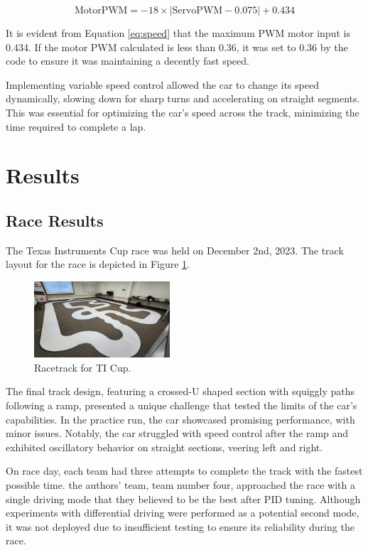 \documentclass[conference]{IEEEtran}
\begin{document}
\begin{equation}
	\text{MotorPWM} = -18 \times |\text{ServoPWM} - 0.075| + 0.434 \label{eq:speed}
\end{equation}

It is evident from Equation \ref{eq:speed} that the maximum PWM motor input is 0.434. If the motor PWM calculated is less than 0.36, it was set to 0.36 by the code to ensure it was maintaining a decently fast speed.

Implementing variable speed control allowed the car to change its speed dynamically, slowing down for sharp turns and accelerating on straight segments. This was essential for optimizing the car's speed across the track, minimizing the time required to complete a lap.

\section{Results}

\subsection{Race Results}

The Texas Instruments Cup race was held on December 2nd, 2023. The track layout for the race is depicted in Figure \ref{fig:track}.

\begin{figure}[htbp]
	\centerline{\includegraphics[width=0.45\textwidth]{images/track.jpg}}
	\caption{Racetrack for TI Cup.}
	\label{fig:track}
\end{figure}

The final track design, featuring a crossed-U shaped section with squiggly paths following a ramp, presented a unique challenge that tested the limits of the car's capabilities. In the practice run, the car showcased promising performance, with minor issues. Notably, the car struggled with speed control after the ramp and exhibited oscillatory behavior on straight sections, veering left and right.

On race day, each team had three attempts to complete the track with the fastest possible time. the authors' team, team number four, approached the race with a single driving mode that they believed to be the best after PID tuning. Although experiments with differential driving were performed as a potential second mode, it was not deployed due to insufficient testing to ensure its reliability during the race.
\end{document}
